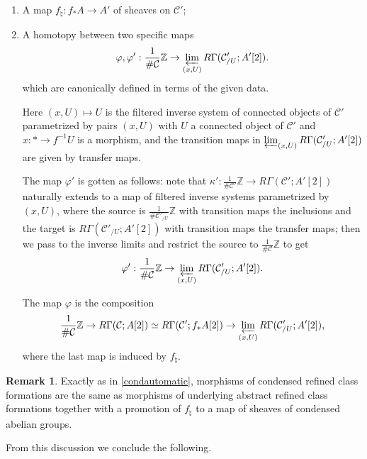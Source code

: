 \documentclass[12pt]{article}
\theoremstyle{definition}
\newtheorem{remark}[theorem]{Remark}
\newcommand{\mc}{\mathcal}
\newcommand{\mbb}{\mathbb}
\begin{document}
\begin{enumerate}

\item A map $f_\natural : f_\ast A \to A'$ of sheaves on $\mc{C}'$;
\item A homotopy between two specific maps
$$\varphi,\varphi':\frac{1}{\#\mc{C}}\mbb{Z} \to \varprojlim_{(x,U)} R\Gamma(\mc{C}'_{/U};A'[2]).$$
which are canonically defined in terms of the given data.

 Here $(x,U)\mapsto U$ is the filtered inverse system of connected objects of $\mc{C}'$ parametrized by pairs $(x,U)$ with $U$ a connected object of $\mc{C}'$ and $x:\ast \to f^{-1}U$ is a morphism,  and the transition maps in $\varprojlim_{(x,U)} R\Gamma(\mc{C}'_{/U};A'[2])$ are given by transfer maps.

The map $\varphi'$ is gotten as follows: note that $\kappa':\frac{1}{\#\mc{C}'}\mbb{Z} \to R\Gamma(\mc{C}';A'[2])$ naturally extends to a map of filtered inverse systems parametrized by $(x,U)$, where the source is $\frac{1}{\#\mc{C}'_{/U}}\mbb{Z}$ with transition maps the inclusions and the target is $R\Gamma(\mc{C}'_{/U};A'[2])$ with transition maps the transfer maps; then we pass to the inverse limits and restrict the source to $\frac{1}{\#\mc{C}}\mbb{Z}$ to get
$$\varphi':\frac{1}{\#\mc{C}}\mbb{Z} \to \varprojlim_{(x,U)} R\Gamma(\mc{C}'_{/U};A'[2]).$$

The map $\varphi$ is the composition
$$\frac{1}{\#\mc{C}}\mbb{Z} \to R\Gamma(\mc{C};A[2])\simeq R\Gamma(\mc{C}';f_\ast A[2])\to\varprojlim_{(x,U)}R\Gamma(\mc{C}'_{/U};A'[2]),$$
where the last map is induced by $f_\natural$.
\end{enumerate}

\begin{remark}
Exactly as in \ref{condautomatic}, morphisms of condensed refined class formations are the same as morphisms of underlying abstract refined class formations together with a promotion of $f_\natural$ to a map of sheaves of condensed abelian groups.
\end{remark}

From this discussion we conclude the following.
\end{document}
